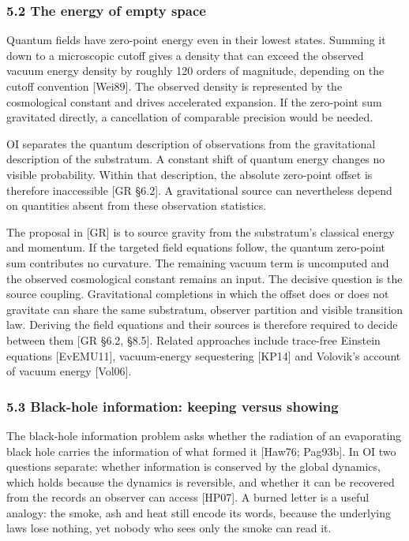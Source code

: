\documentclass[
]{article}
\begin{document}
\hypertarget{the-energy-of-empty-space}{%
\subsubsection{5.2 The energy of empty
space}\label{the-energy-of-empty-space}}

Quantum fields have zero-point energy even in their lowest states.
Summing it down to a microscopic cutoff gives a density that can exceed
the observed vacuum energy density by roughly 120 orders of magnitude,
depending on the cutoff convention {[}Wei89{]}. The observed density is
represented by the cosmological constant and drives accelerated
expansion. If the zero-point sum gravitated directly, a cancellation of
comparable precision would be needed.

OI separates the quantum description of observations from the
gravitational description of the substratum. A constant shift of quantum
energy changes no visible probability. Within that description, the
absolute zero-point offset is therefore inaccessible {[}GR §6.2{]}. A
gravitational source can nevertheless depend on quantities absent from
these observation statistics.

The proposal in {[}GR{]} is to source gravity from the substratum's
classical energy and momentum. If the targeted field equations follow,
the quantum zero-point sum contributes no curvature. The remaining
vacuum term is uncomputed and the observed cosmological constant remains
an input. The decisive question is the source coupling. Gravitational
completions in which the offset does or does not gravitate can share the
same substratum, observer partition and visible transition law. Deriving
the field equations and their sources is therefore required to decide
between them {[}GR §6.2, §8.5{]}. Related approaches include trace-free
Einstein equations {[}EvEMU11{]}, vacuum-energy sequestering {[}KP14{]}
and Volovik's account of vacuum energy {[}Vol06{]}.

\hypertarget{black-hole-information-keeping-versus-showing}{%
\subsubsection{5.3 Black-hole information: keeping versus
showing}\label{black-hole-information-keeping-versus-showing}}

The black-hole information problem asks whether the radiation of an
evaporating black hole carries the information of what formed it
{[}Haw76; Pag93b{]}. In OI two questions separate: whether information
is conserved by the global dynamics, which holds because the dynamics is
reversible, and whether it can be recovered from the records an observer
can access {[}HP07{]}. A burned letter is a useful analogy: the smoke,
ash and heat still encode its words, because the underlying laws lose
nothing, yet nobody who sees only the smoke can read it.
\end{document}
